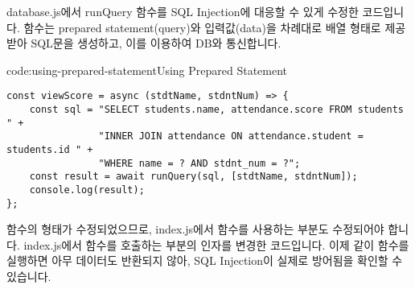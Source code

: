 \는 database.js에서 runQuery 함수를 SQL Injection에 대응할 수 있게 수정한 코드입니다.  함수는 prepared statement(query)와 입력값(data)을 차례대로 배열 형태로 제공받아 SQL문을 생성하고, 이를 이용하여 DB와 통신합니다.

\begin{codeenv}{code:using-prepared-statement}{Using Prepared Statement}\begin{verbatim}
const viewScore = async (stdtName, stdntNum) => {
    const sql = "SELECT students.name, attendance.score FROM students " +
                "INNER JOIN attendance ON attendance.student = students.id " +
                "WHERE name = ? AND stdnt_num = ?";
    const result = await runQuery(sql, [stdtName, stdntNum]);
    console.log(result);
};
\end{verbatim}
\end{codeenv}

 함수의 형태가 수정되었으므로, index.js에서  함수를 사용하는 부분도 수정되어야 합니다. \는 index.js에서  함수를 호출하는 부분의 인자를 변경한 코드입니다. 이제 \와 같이  함수를 실행하면 아무 데이터도 반환되지 않아, SQL Injection이 실제로 방어됨을 확인할 수 있습니다.
